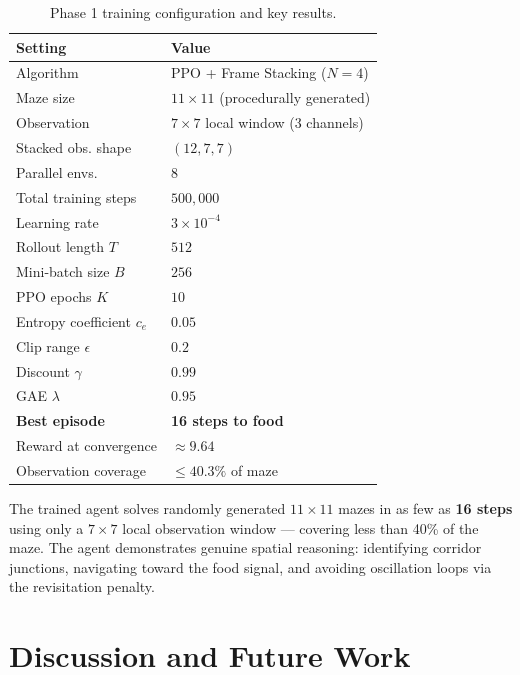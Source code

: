 \documentclass[11pt,a4paper]{article}
\begin{document}
\begin{table}[h]
\centering
\caption{Phase 1 training configuration and key results.}
\begin{tabular}{@{}ll@{}}
\toprule
\textbf{Setting} & \textbf{Value} \\
\midrule
Algorithm & PPO + Frame Stacking ($N=4$) \\
Maze size & $11 \times 11$ (procedurally generated) \\
Observation & $7 \times 7$ local window ($3$ channels) \\
Stacked obs. shape & $(12, 7, 7)$ \\
Parallel envs. & $8$ \\
Total training steps & $500{,}000$ \\
Learning rate & $3 \times 10^{-4}$ \\
Rollout length $T$ & $512$ \\
Mini-batch size $B$ & $256$ \\
PPO epochs $K$ & $10$ \\
Entropy coefficient $c_e$ & $0.05$ \\
Clip range $\epsilon$ & $0.2$ \\
Discount $\gamma$ & $0.99$ \\
GAE $\lambda$ & $0.95$ \\
\midrule
\textbf{Best episode} & \textbf{16 steps to food} \\
Reward at convergence & $\approx 9.64$ \\
Observation coverage & $\le 40.3\%$ of maze \\
\bottomrule
\end{tabular}
\end{table}

\begin{keyresult}
The trained agent solves randomly generated $11\times11$ mazes in as few as
\textbf{16 steps} using only a $7\times7$ local observation window —
covering less than 40\% of the maze.
The agent demonstrates genuine spatial reasoning:
identifying corridor junctions, navigating toward the food signal,
and avoiding oscillation loops via the revisitation penalty.
\end{keyresult}

\section{Discussion and Future Work}
\end{document}
